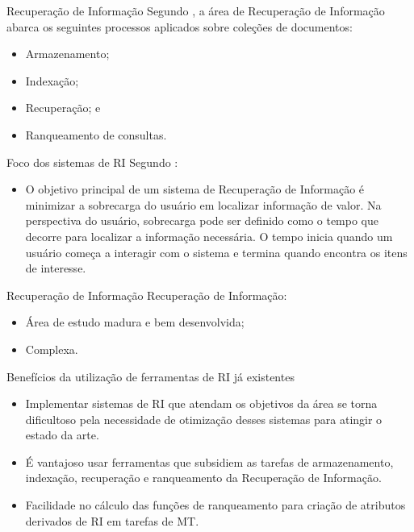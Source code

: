 \documentclass[%
  10pt,%
  aspectratio = 169,%
  compress,%
  t,%
]{beamer}%
\begin{document}
    \begin{frame}{}{Recuperação de Informação}
        Segundo \cite[p.~5--8]{Baeza-Yates2011}, a área de Recuperação de Informação abarca os seguintes processos aplicados sobre coleções de documentos:
        \begin{itemize}
            \item Armazenamento;
            \item Indexação;
            \item Recuperação; e
            \item Ranqueamento de consultas.
        \end{itemize}

        \begin{block}{Foco dos sistemas de RI}
            Segundo \cite[p.~2, tradução nossa]{KowalskiIRAA201}:
            \begin{itemize}
                \item O objetivo principal de um sistema de Recuperação de Informação é minimizar a sobrecarga do usuário em localizar informação de valor.
                Na perspectiva do usuário, sobrecarga pode ser definido como o tempo que decorre para localizar a informação necessária.
                O tempo inicia quando um usuário começa a interagir com o sistema e termina quando encontra os itens de interesse.
            \end{itemize}
        \end{block}
    \end{frame}

    \begin{frame}{}{Recuperação de Informação}
        Recuperação de Informação:
        \begin{itemize}
            \item Área de estudo madura e bem desenvolvida;
            \item Complexa.
        \end{itemize}

        \begin{block}{Benefícios da utilização de ferramentas de RI já existentes}
            \begin{itemize}
                \item Implementar sistemas de RI que atendam os objetivos da área se torna dificultoso pela necessidade de otimização desses sistemas para atingir o estado da arte.

                \item É vantajoso usar ferramentas que subsidiem as tarefas de armazenamento, indexação, recuperação e ranqueamento da Recuperação de Informação.

                \item Facilidade no cálculo das funções de ranqueamento para criação de atributos derivados de RI em tarefas de MT.
            \end{itemize}
        \end{block}
    \end{frame}
\end{document}
